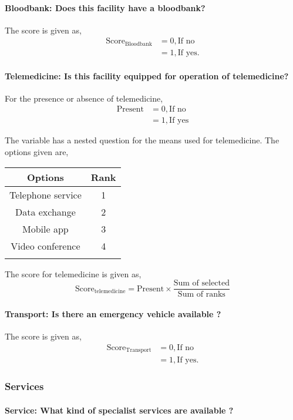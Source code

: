 \documentclass[oneside]{article}
\newcommand{\tsub}[2]{\text{#1}_{\text{#2}}}
\newcommand{\dsub}[2]{\dfrac{\text{#1}}{\text{#2}}}
\newenvironment{ttable}
{
\begin{center}
\begin{tabular}{c|c}
\hline
}
{
\\ \hline
\end{tabular}
\end{center}
}
\begin{document}
\paragraph{Bloodbank: Does this facility have a bloodbank?}

The score is given as,
\begin{align*}
\tsub{Score}{Bloodbank} &= 0, \text{If no} \\
        &= 1, \text{If yes}.
\end{align*}
\paragraph{Telemedicine: Is this facility equipped for operation of telemedicine?}

For the presence or absence of telemedicine,
\begin{align*}
	\text{Present} &= 0, \text{If no} \\
	&= 1, \text{If yes}
\end{align*}

The variable has a nested question for the means used for telemedicine. The options given are,
\begin{ttable}
	Options & Rank \\ \hline
	Telephone service & 1 \\
	Data exchange & 2 \\
	Mobile app & 3 \\
	Video conference & 4 \\ \hline
\end{ttable}
The score for telemedicine is given as,
\[
	\tsub{Score}{telemedicine} = \text{Present} \times \dsub{Sum of selected}{Sum of ranks}
\]	
\paragraph{Transport: Is there an emergency vehicle available ?}

The score is given as,
\begin{align*}
\tsub{Score}{Transport} &= 0, \text{If no} \\
        &= 1, \text{If yes}.
\end{align*}
\subsubsection{Services}

\paragraph{Service: What kind of specialist services are available ?}
\end{document}
